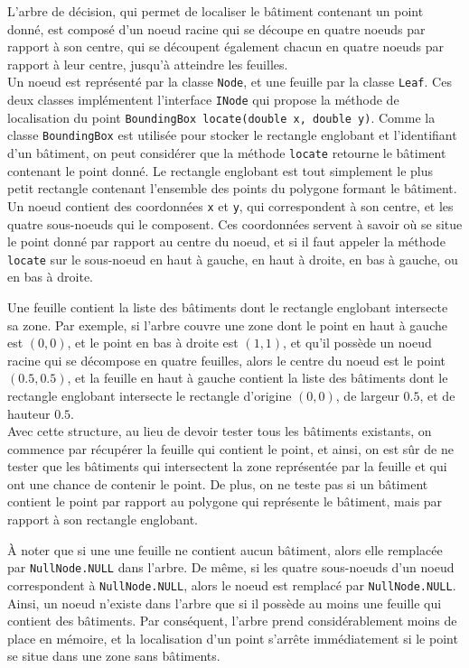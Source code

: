 L'arbre de décision, qui permet de localiser le bâtiment contenant un point donné, est composé d'un noeud racine qui se découpe en quatre noeuds par rapport à son centre, qui se découpent également chacun en quatre noeuds par rapport à leur centre, jusqu'à atteindre les feuilles.\\

Un noeud est représenté par la classe \texttt{Node}, et une feuille par la classe \texttt{Leaf}. Ces deux classes implémentent l'interface \texttt{INode} qui propose la méthode de localisation du point \texttt{BoundingBox locate(double x, double y)}. Comme la classe \texttt{BoundingBox} est utilisée pour stocker le rectangle englobant et l'identifiant d'un bâtiment, on peut considérer que la méthode \texttt{locate} retourne le bâtiment contenant le point donné. Le rectangle englobant est tout simplement le plus petit rectangle contenant l'ensemble des points du polygone formant le bâtiment.\\

Un noeud contient des coordonnées \texttt{x} et \texttt{y}, qui correspondent à son centre, et les quatre sous-noeuds qui le composent. Ces coordonnées servent à savoir où se situe le point donné par rapport au centre du noeud, et si il faut appeler la méthode \texttt{locate} sur le sous-noeud en haut à gauche, en haut à droite, en bas à gauche, ou en bas à droite.

Une feuille contient la liste des bâtiments dont le rectangle englobant intersecte sa zone. Par exemple, si l'arbre couvre une zone dont le point en haut à gauche est $(0, 0)$, et le point en bas à droite est $(1, 1)$, et qu'il possède un noeud racine qui se décompose en quatre feuilles, alors le centre du noeud est le point $(0.5, 0.5)$, et la feuille en haut à gauche contient la liste des bâtiments dont le rectangle englobant intersecte le rectangle d'origine $(0, 0)$, de largeur $0.5$, et de hauteur $0.5$.\\

Avec cette structure, au lieu de devoir tester tous les bâtiments existants, on commence par récupérer la feuille qui contient le point, et ainsi, on est sûr de ne tester que les bâtiments qui intersectent la zone représentée par la feuille et qui ont une chance de contenir le point. De plus, on ne teste pas si un bâtiment contient le point par rapport au polygone qui représente le bâtiment, mais par rapport à son rectangle englobant.

\`{A} noter que si une une feuille ne contient aucun bâtiment, alors elle remplacée par \texttt{NullNode.NULL} dans l'arbre. De même, si les quatre sous-noeuds d'un noeud correspondent à \texttt{NullNode.NULL}, alors le noeud est remplacé par \texttt{NullNode.NULL}. Ainsi, un noeud n'existe dans l'arbre que si il possède au moins une feuille qui contient des bâtiments. Par conséquent, l'arbre prend considérablement moins de place en mémoire, et la localisation d'un point s'arrête immédiatement si le point se situe dans une zone sans bâtiments.